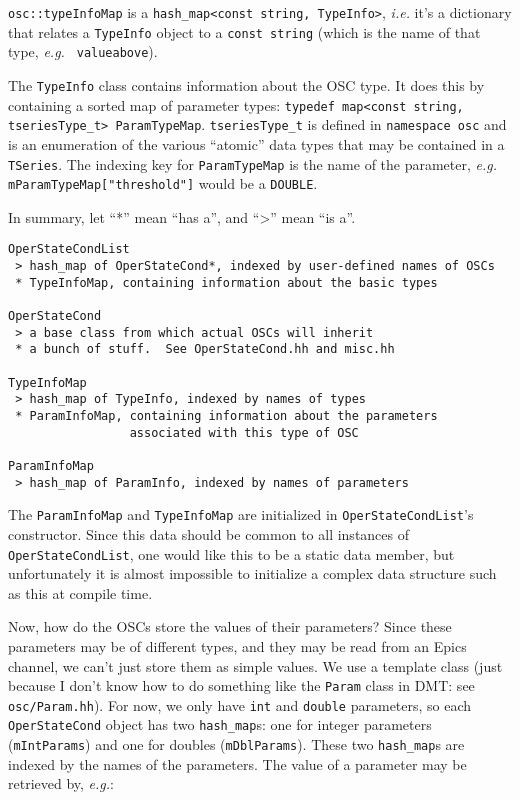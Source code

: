 \documentclass[11pt]{article}
\begin{document}
\texttt{osc::typeInfoMap} is a \texttt{hash\_map<const string, TypeInfo>},
\textit{i.e.}  it's a dictionary that relates a \texttt{TypeInfo} object to
a \texttt{const string} (which is the name of that type, \textit{e.g.} \texttt{
valueabove}).

The \texttt{TypeInfo} class contains information about the OSC type.
It does this by containing a sorted map of parameter types:
\texttt{typedef map<const string, tseriesType\_t> ParamTypeMap}.
\texttt{tseriesType\_t} is defined in \texttt{namespace osc} and is
an enumeration of the various ``atomic'' data types that may be
contained in a \texttt{TSeries}.  The indexing key for
\texttt{ParamTypeMap} is the name of the parameter, \textit{e.g.}
\texttt{mParamTypeMap["threshold"]} would be a \texttt{DOUBLE}.

In summary, let ``*'' mean ``has a'', and ``>'' mean ``is a''.

\begin{verbatim}
OperStateCondList
 > hash_map of OperStateCond*, indexed by user-defined names of OSCs
 * TypeInfoMap, containing information about the basic types

OperStateCond
 > a base class from which actual OSCs will inherit
 * a bunch of stuff.  See OperStateCond.hh and misc.hh

TypeInfoMap 
 > hash_map of TypeInfo, indexed by names of types
 * ParamInfoMap, containing information about the parameters
                 associated with this type of OSC

ParamInfoMap 
 > hash_map of ParamInfo, indexed by names of parameters

\end{verbatim}

The \texttt{ParamInfoMap} and \texttt{TypeInfoMap} are initialized in 
\texttt{OperStateCondList}'s constructor.  Since this data should be common
to all instances of \texttt{OperStateCondList}, one would like this to be
a static data member, but unfortunately it is almost impossible to
initialize a complex data structure such as this at compile time.

Now, how do the OSCs store the values of their parameters?  Since
these parameters may be of different types, and they may be read from
an Epics channel, we can't just store them as simple values.  We use a
template class (just because I don't know how to do something like the
\texttt{Param} class in DMT: see \texttt{osc/Param.hh}).  For now, we
only have \texttt{int} and \texttt{double} parameters, so each
\texttt{OperStateCond} object has two \texttt{hash\_map}s: one for
integer parameters (\texttt{mIntParams}) and one for doubles
(\texttt{mDblParams}).  These two \texttt{hash\_map}s are indexed by
the names of the parameters. The value of a parameter may be retrieved
by, \textit{e.g.}:
\end{document}
